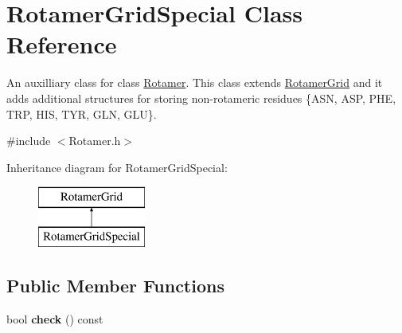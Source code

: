 \hypertarget{classRotamerGridSpecial}{\section{Rotamer\-Grid\-Special Class Reference}
\label{classRotamerGridSpecial}
}


An auxilliary class for class \hyperlink{classRotamer}{Rotamer}. This class extends \hyperlink{classRotamerGrid}{Rotamer\-Grid} and it adds additional structures for storing non-\/rotameric residues \{A\-S\-N, A\-S\-P, P\-H\-E, T\-R\-P, H\-I\-S, T\-Y\-R, G\-L\-N, G\-L\-U\}.  




{\ttfamily \#include $<$Rotamer.\-h$>$}

Inheritance diagram for Rotamer\-Grid\-Special\-:\begin{figure}[H]
\begin{center}
\leavevmode
\includegraphics[height=2.000000cm]{classRotamerGridSpecial}
\end{center}
\end{figure}
\subsection*{Public Member Functions}
\begin{DoxyCompactItemize}
\item 
\hypertarget{classRotamerGridSpecial_a072d5082c0eaa6cd68f33e33fbdbf9c2}{bool {\bfseries check} () const }\label{classRotamerGridSpecial_a072d5082c0eaa6cd68f33e33fbdbf9c2}

\end{DoxyCompactItemize}
